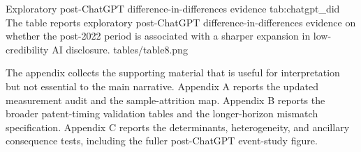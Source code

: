 \tablepdf
{Exploratory post-ChatGPT difference-in-differences evidence}
{tab:chatgpt_did}
{The table reports exploratory post-ChatGPT difference-in-differences evidence on whether the post-2022 period is associated with a sharper expansion in low-credibility AI disclosure.}
{tables/table8.png}
\FloatBarrier

The appendix collects the supporting material that is useful for interpretation but not essential to the main narrative. Appendix A reports the updated measurement audit and the sample-attrition map. Appendix B reports the broader patent-timing validation tables and the longer-horizon mismatch specification. Appendix C reports the determinants, heterogeneity, and ancillary consequence tests, including the fuller post-ChatGPT event-study figure.